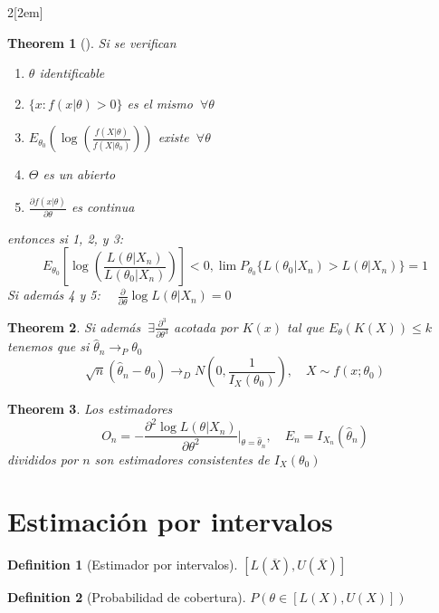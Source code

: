 \documentclass[leqno]{article}
\newtheorem*{theorem}{Theorem}
\newtheorem*{definition}{Definition}
\begin{document}
\begin{multicols}{2}[\columnsep2em]
\begin{theorem}[] Si se verifican 
  \begin{enumerate}[topsep=-6pt, itemsep=0pt]
    \item $\theta $ identificable
	\item $\{x:f(x|\theta )>0\}$ es el mismo $\ \forall \theta $
	\item $E_{\theta _0}( \log (\frac{f(X|\theta )}{f(X|\theta _0)}))$ existe $\ \forall \theta $ 
	\item  $\Theta$ es un abierto
	\item  $\frac{\partial f(x|\theta )}{\partial \theta }$ es continua
  \end{enumerate}
  entonces si 1, 2, y 3:
  \[
	E_{\theta _0}\left[ \log \left( \frac{L(\theta |X_n)}{L(\theta _{0}|X_n)} \right)  \right] <0, \lim P_{\theta _0}\{L(\theta _0|X_n)>L(\theta |X_n)\} = 1
  \] 
  Si además 4 y 5: $\quad \displaystyle \frac{\partial}{\partial\theta }\log L(\theta |X_n)=0$ 
\end{theorem}

\begin{theorem} Si además $\ \exists \frac{\partial^3}{\partial \theta ^3}$ acotada por $K(x)$ tal que  $E_\theta (K(X))\le k$ tenemos que si $\hat{\theta }_n \to _P \theta _0$ 
  \[
  \sqrt{n}(\hat{\theta }_n-\theta_0) \to _D N(0, \frac{1}{I_X(\theta _0)}), \quad X \sim  f(x;\theta _0)
  \] 
\end{theorem}

\begin{theorem} Los estimadores
  \[
  O_n = -\frac{\partial^2 \log L(\theta | X_n)}{\partial\theta ^2}|_{\theta =\hat{\theta }_n}, \quad E_n = I_{X_n}(\hat{\theta }_n) 
  \] 
  divididos por $n$ son estimadores consistentes de  $I_X(\theta _0)$

\end{theorem}







\section{Estimación por intervalos}

\begin{definition}[Estimador por intervalos] $[L(\overline{X}), U(\overline{X})]$
\end{definition}

\begin{definition}[Probabilidad de cobertura]
$P(\theta \in [L(X), U(X)])$
\end{definition}


\end{multicols}
\end{document}
